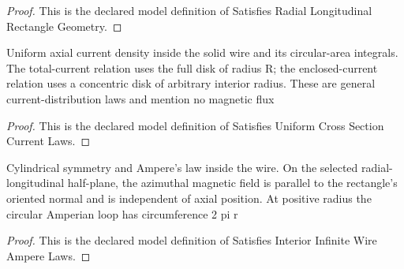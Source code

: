 \begin{proof}
  This is the declared model definition of Satisfies Radial Longitudinal Rectangle Geometry.
\end{proof}
\begin{definition}
  \label{def:physics:phyx-mini-0975:phyxminiproblems-problemphyxmini0975-satisfiesuniformcrosssectioncurrentlaws}
  Uniform axial current density inside the solid wire and its circular-area integrals. The total-current relation uses the full disk of radius R; the enclosed-current relation uses a concentric disk of arbitrary interior radius. These are general current-distribution laws and mention no magnetic flux
\end{definition}
\begin{proof}
  This is the declared model definition of Satisfies Uniform Cross Section Current Laws.
\end{proof}
\begin{definition}
  \label{def:physics:phyx-mini-0975:phyxminiproblems-problemphyxmini0975-satisfiesinteriorinfinitewireamperelaws}
  Cylindrical symmetry and Ampere's law inside the wire. On the selected radial-longitudinal half-plane, the azimuthal magnetic field is parallel to the rectangle's oriented normal and is independent of axial position. At positive radius the circular Amperian loop has circumference 2 pi r
\end{definition}
\begin{proof}
  This is the declared model definition of Satisfies Interior Infinite Wire Ampere Laws.
\end{proof}
